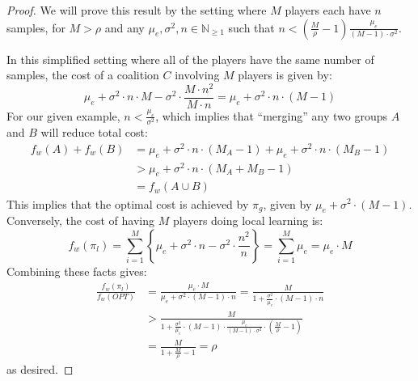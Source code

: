 \documentclass{article}
\newcommand{\p}[1]{\left( #1 \right)}
\newcommand{\cb}[1]{\left\{ #1 \right\}}
\newcommand{\cd}[0]{\cdot}
\newcommand{\nplayer}[0]{\ensuremath{M}}
\newcommand{\mue}[0]{\ensuremath{\mu_e}}
\newcommand{\var}[0]{\ensuremath{\sigma^2}}
\newcommand{\ndraw}[0]{\ensuremath{n}}
\newcommand{\alone}[0]{\ensuremath{\pi_l}}
\newcommand{\gcol}[0]{\ensuremath{\pi_g}}
\newcommand{\col}[0]{\ensuremath{C}}
\newcommand{\costw}[0]{\ensuremath{f_w}}
\begin{document}
\alonebad*
\begin{proof}
We will prove this result by the setting where $\nplayer$ players each have $\ndraw$ samples, for $\nplayer > \rho$ and any $\mue, \var, \ndraw \in \mathbb{N}_{\geq 1}$ such that $\ndraw < \p{\frac{\nplayer}{\rho}-1} \frac{\mue}{(\nplayer-1) \cd \var}$.

In this simplified setting where all of the players have the same number of samples, the cost of a coalition $\col$ involving $\nplayer$ players is given by: 
$$\mue + \var \cd \ndraw \cd \nplayer - \var \cd \frac{\nplayer \cd \ndraw^2}{\nplayer \cd \ndraw} = \mue + \var \cd \ndraw \cd (\nplayer -1)$$
For our given example, $\ndraw < \frac{\mue}{\var}$, which implies that \enquote{merging} any two groups $A$ and $B$ will reduce total cost: 
\begin{align*}
\costw(A) + \costw(B) &= \mue + \var \cd \ndraw \cd (\nplayer_A -1)+ \mue + \var \cd \ndraw \cd (\nplayer_B -1) \\
&> \mue + \var \cd \ndraw \cd (\nplayer_A + \nplayer_B -1) \\
&= \costw(A \cup B)
\end{align*}
This implies that the optimal cost is achieved by $\gcol$, given by $\mue + \var \cd (\nplayer -1)$. Conversely, the cost of having $\nplayer$ players doing local learning is:
$$\costw(\alone) = \sum_{i=1}^{\nplayer}\cb{\mue + \var \cd \ndraw - \var \cd \frac{\ndraw^2}{\ndraw}} = \sum_{i=1}^{\nplayer} \mue = \mue \cd \nplayer$$
Combining these facts gives:
\begin{align*}
\frac{\costw(\alone)}{\costw(OPT)} &=\frac{\mue \cd \nplayer}{\mue + \var \cd (\nplayer-1) \cd \ndraw} = \frac{\nplayer}{1 + \frac{\var}{\mue} \cd (\nplayer-1) \cd \ndraw}\\  
 &> \frac{\nplayer}{1 + \frac{\var}{\mue} \cd (\nplayer-1) \cd \frac{\mue}{(\nplayer-1) \cd \var }\cd \p{\frac{\nplayer}{\rho} -1}}\\
 &= \frac{\nplayer}{1 + \frac{\nplayer}{\rho} -1} = \rho
\end{align*}
as desired. 
\end{proof}
\end{document}
